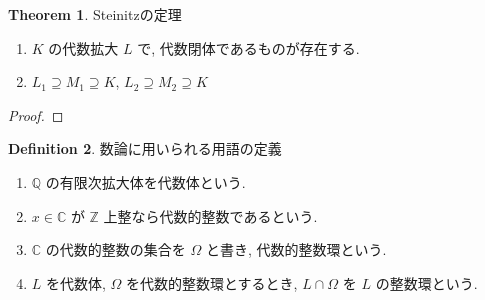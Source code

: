 \documentclass[a4paper,dvipdfmx]{jsarticle}
\theoremstyle{plain}
\theoremstyle{definition}
\theoremstyle{plain}
\numberwithin{equation}{section}
\numberwithin{theorem}{section}
\numberwithin{definition}{section}
\numberwithin{note}{section}
\theoremstyle{definition}
\newtheorem{dfn}{Definition}[section]
\newtheorem{thm}[dfn]{Theorem}
\begin{document}
\begin{thm}
  Steinitzの定理
  \begin{enumerate}
    \item $K$ の代数拡大 $L$ で, 代数閉体であるものが存在する.
    \item $L_1\supseteq M_1\supseteq K$, $L_2\supseteq M_2\supseteq K$
  \end{enumerate}
\end{thm}
\begin{proof}
\end{proof}

\begin{dfn}
  数論に用いられる用語の定義
  \begin{enumerate}
    \item $\mathbb{Q}$ の有限次拡大体を代数体という.
    \item $x\in\mathbb{C}$ が $\mathbb{Z}$ 上整なら代数的整数であるという.
    \item $\mathbb{C}$ の代数的整数の集合を $\Omega$ と書き, 代数的整数環という.
    \item $L$ を代数体, $\Omega$ を代数的整数環とするとき, $L\cap\Omega$ を $L$ の整数環という.
  \end{enumerate}
\end{dfn}
\end{document}

